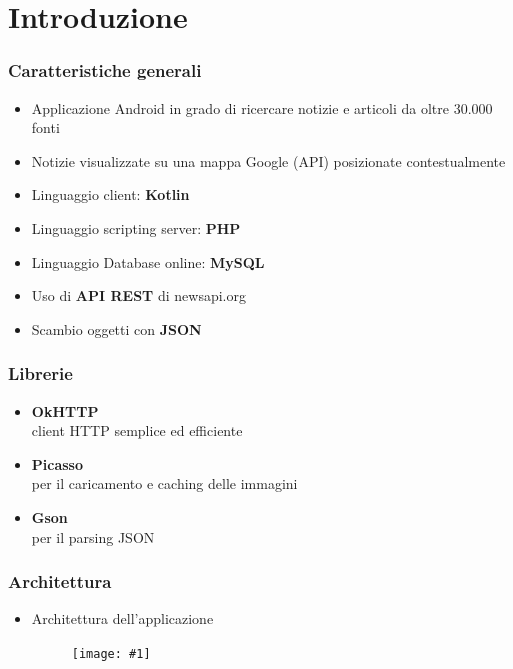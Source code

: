 \documentclass{beamer}
\def\image[#1][#2]{
	\begin{figure}[H]
		\centering
		\texttt{[image: \#1]}
\end{figure}}
\begin{document}
	\section{Introduzione}
		\begin{frame}
			\frametitle{Caratteristiche generali}
			\begin{itemize}
				\item Applicazione Android in grado di ricercare notizie e articoli da
oltre 30.000 fonti
				\item Notizie visualizzate su una mappa Google (API) posizionate contestualmente

				
			\end{itemize}
		\end{frame}
		\begin{frame}
					\begin{itemize}
			\frametitle{Linguaggi}
				\item Linguaggio client: \textbf{Kotlin}
				
				\item Linguaggio scripting server: \textbf{PHP}
				\item Linguaggio Database online: \textbf{MySQL}
				\item Uso di \textbf{API REST} di newsapi.org
				\item Scambio oggetti con \textbf{JSON}
								
			\end{itemize}
		\end{frame}
		\begin{frame}
			\frametitle{Librerie}
			\begin{itemize}
				\item \textbf{OkHTTP} \\ {\footnotesize\hspace{1em} client HTTP semplice ed efficiente}
				\item \textbf{Picasso} \\ {\footnotesize\hspace{1em} per il caricamento e caching delle immagini} 
				\item \textbf{Gson} \\ {\footnotesize\hspace{1em} per il parsing JSON}
				
			\end{itemize}
		\end{frame}
		
				\begin{frame}
			\frametitle{Architettura}
			\begin{itemize}
				\item Architettura dell'applicazione
				\image[images/Diagram.png][scale=0.3]
			\end{itemize}
		\end{frame}
\end{document}
